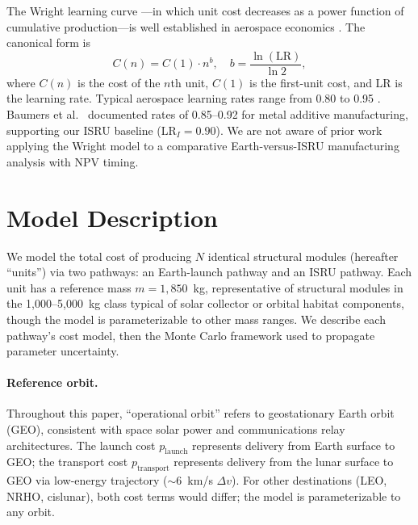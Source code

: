 \documentclass[preprint,12pt]{elsarticle}
\begin{document}
The Wright learning curve \cite{wright1936}---in which unit cost decreases as a power function of cumulative production---is well established in aerospace economics \cite{dutton1984,argote1990,nagy2013}. The canonical form is
\begin{equation}
  C(n) = C(1) \cdot n^{b}, \quad b = \frac{\ln(\text{LR})}{\ln 2},
  \label{eq:wright}
\end{equation}
where $C(n)$ is the cost of the $n$th unit, $C(1)$ is the first-unit cost, and LR is the learning rate. Typical aerospace learning rates range from 0.80 to 0.95 \cite{wertz2011}. Baumers et al.\ \cite{baumers2016} documented rates of 0.85--0.92 for metal additive manufacturing, supporting our ISRU baseline ($\mathrm{LR}_I = 0.90$). We are not aware of prior work applying the Wright model to a comparative Earth-versus-ISRU manufacturing analysis with NPV timing.

\section{Model Description}
\label{sec:model}

We model the total cost of producing $N$ identical structural modules (hereafter ``units'') via two pathways: an Earth-launch pathway and an ISRU pathway. Each unit has a reference mass $m = 1{,}850$~kg, representative of structural modules in the 1{,}000--5{,}000~kg class typical of solar collector or orbital habitat components, though the model is parameterizable to other mass ranges. We describe each pathway's cost model, then the Monte Carlo framework used to propagate parameter uncertainty.

\paragraph{Reference orbit.} Throughout this paper, ``operational orbit'' refers to geostationary Earth orbit (GEO), consistent with space solar power and communications relay architectures. The launch cost $p_{\mathrm{launch}}$ represents delivery from Earth surface to GEO; the transport cost $p_{\mathrm{transport}}$ represents delivery from the lunar surface to GEO via low-energy trajectory ($\sim$6~km/s $\Delta v$). For other destinations (LEO, NRHO, cislunar), both cost terms would differ; the model is parameterizable to any orbit.
\end{document}
